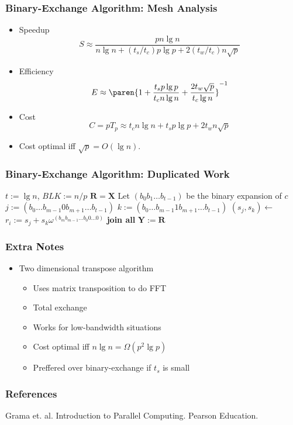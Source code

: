 \documentclass[xcolor=pdftex,dvipsnames,table]{presentation}
\begin{document}
\begin{frame}
	\frametitle{Binary-Exchange Algorithm: Mesh Analysis}

	\begin{itemize}
		\item Speedup
		\[
			S\approx \frac{pn\lg n}{n\lg n+(t_s/t_c)p\lg p + 2(t_w/t_c)n\sqrt{p}}
		\]
		\item Efficiency
		\[
			E\approx \paren{1+\frac{t_s p\lg p}{t_c n\lg n}+\frac{2t_w\sqrt{p}}{t_c\lg n}}^{-1}
		\]
		\item Cost
		\[
			C=pT_p\approx t_c n\lg n+ t_s p\lg p +2t_w n\sqrt{p}
		\]
		\item Cost optimal iff $\sqrt{p}=O(\lg n)$.
	\end{itemize}
\end{frame}

\begin{frame}
	\frametitle{Binary-Exchange Algorithm: Duplicated Work}

	\begin{algorithmic}[1]
			\State $t:=\lg n$, $BLK:=n/p$
			\State $\mathbf{R}=\mathbf{X}$
						\State Let $(b_0b_1\ldots b_{t-1})$ be the binary expansion of $c$
						\State $j:=(b_0\ldots b_{m-1}0b_{m+1}\ldots b_{t-1})$
						\State $k:=(b_0\ldots b_{m-1}1b_{m+1}\ldots b_{t-1})$
						\State $(s_j,s_k)\gets$
						\State $r_i:= s_j+s_k\omega^{(b_mb_{m-1}\ldots b_0 0\ldots0)}$
					\EndFor
				\EndFor
			\EndSpawn
			\State \textbf{join all}
			\State $\mathbf{Y}:=\mathbf{R}$
		\EndFunction
	\end{algorithmic}
\end{frame}

\begin{frame}
	\frametitle{Extra Notes}

	\begin{itemize}
		\item Two dimensional transpose algorithm
		\begin{itemize}
			\item Uses matrix transposition to do FFT
			\item Total exchange
			\item Works for low-bandwidth situations
			\item Cost optimal iff $n\lg n = \Omega(p^2\lg p)$
			\item Preffered over binary-exchange if $t_s$ is small
		\end{itemize}
	\end{itemize}
\end{frame}

\begin{frame}[allowframebreaks]
\frametitle{References}
	\begin{thebibliography}{10}
		Grama et. al.
		\newblock{} Introduction to Parallel Computing.
		\newblock{} Pearson Education.
	\end{thebibliography}
\end{frame}
\end{document}
